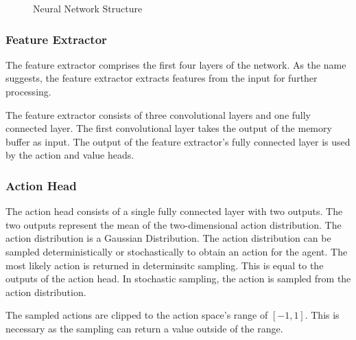 \begin{figure}[!h]
    \caption{Neural Network Structure}
    \label{fig:network_structure}
\end{figure}

\subsubsection{Feature Extractor}

The feature extractor comprises the first four layers of the network. As the name suggests, the feature extractor extracts features from the input for further processing.

The feature extractor consists of three convolutional layers and one fully connected layer. The first convolutional layer takes the output of the memory buffer as input. The output of the feature extractor's fully connected layer is used by the action and value heads.


\subsubsection{Action Head}
\label{sec:action_sampling}

The action head consists of a single fully connected layer with two outputs. The two outputs represent the mean of the two-dimensional action distribution. The action distribution is a Gaussian Distribution. The action distribution can be sampled deterministically or stochastically to obtain an action for the agent. The most likely action is returned in determinsitc sampling. This is equal to the outputs of the action head. In stochastic sampling, the action is sampled from the action distribution.

The sampled actions are clipped to the action space's range of $[-1,1]$. This is necessary as the sampling can return a value outside of the range.

